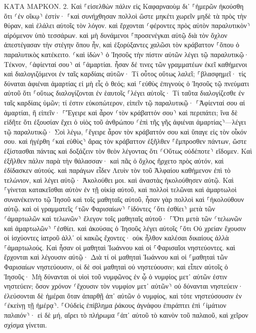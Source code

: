 \documentclass[twoside, 9pt]{extreport}
\begin{document}
ΚΑΤΑ ΜΑΡΚΟΝ.
2.
Καὶ ⸀εἰσελθὼν πάλιν εἰς Καφαρναοὺμ δι᾽ ⸀ἡμερῶν ἠκούσθη ὅτι ⸂ἐν οἴκῳ⸃ ἐστίν· 
⸀καὶ συνήχθησαν πολλοὶ ὥστε μηκέτι χωρεῖν μηδὲ τὰ πρὸς τὴν θύραν, καὶ ἐλάλει αὐτοῖς τὸν λόγον. 
καὶ ἔρχονται ⸂φέροντες πρὸς αὐτὸν παραλυτικὸν⸃ αἰρόμενον ὑπὸ τεσσάρων. 
καὶ μὴ δυνάμενοι ⸀προσενέγκαι αὐτῷ διὰ τὸν ὄχλον ἀπεστέγασαν τὴν στέγην ὅπου ἦν, καὶ ἐξορύξαντες χαλῶσι τὸν κράβαττον ⸀ὅπου ὁ παραλυτικὸς κατέκειτο. 
⸂καὶ ἰδὼν⸃ ὁ Ἰησοῦς τὴν πίστιν αὐτῶν λέγει τῷ παραλυτικῷ· Τέκνον, ⸂ἀφίενταί σου⸃ αἱ ⸀ἁμαρτίαι. 
ἦσαν δέ τινες τῶν γραμματέων ἐκεῖ καθήμενοι καὶ διαλογιζόμενοι ἐν ταῖς καρδίαις αὐτῶν· 
Τί οὗτος οὕτως λαλεῖ; ⸀βλασφημεῖ· τίς δύναται ἀφιέναι ἁμαρτίας εἰ μὴ εἷς ὁ θεός; 
καὶ ⸀εὐθὺς ἐπιγνοὺς ὁ Ἰησοῦς τῷ πνεύματι αὐτοῦ ὅτι ⸀οὕτως διαλογίζονται ἐν ἑαυτοῖς ⸀λέγει αὐτοῖς· Τί ταῦτα διαλογίζεσθε ἐν ταῖς καρδίαις ὑμῶν; 
τί ἐστιν εὐκοπώτερον, εἰπεῖν τῷ παραλυτικῷ· ⸀Ἀφίενταί σου αἱ ἁμαρτίαι, ἢ εἰπεῖν· ⸀Ἔγειρε καὶ ἆρον ⸂τὸν κράβαττόν σου⸃ καὶ περιπάτει; 
ἵνα δὲ εἰδῆτε ὅτι ἐξουσίαν ἔχει ὁ υἱὸς τοῦ ἀνθρώπου ⸂ἐπὶ τῆς γῆς ἀφιέναι ἁμαρτίας⸃—λέγει τῷ παραλυτικῷ· 
Σοὶ λέγω, ⸀ἔγειρε ἆρον τὸν κράβαττόν σου καὶ ὕπαγε εἰς τὸν οἶκόν σου. 
καὶ ἠγέρθη ⸂καὶ εὐθὺς⸃ ἄρας τὸν κράβαττον ἐξῆλθεν ⸀ἔμπροσθεν πάντων, ὥστε ἐξίστασθαι πάντας καὶ δοξάζειν τὸν θεὸν λέγοντας ὅτι ⸂Οὕτως οὐδέποτε⸃ εἴδομεν. 
Καὶ ἐξῆλθεν πάλιν παρὰ τὴν θάλασσαν· καὶ πᾶς ὁ ὄχλος ἤρχετο πρὸς αὐτόν, καὶ ἐδίδασκεν αὐτούς. 
καὶ παράγων εἶδεν Λευὶν τὸν τοῦ Ἁλφαίου καθήμενον ἐπὶ τὸ τελώνιον, καὶ λέγει αὐτῷ· Ἀκολούθει μοι. καὶ ἀναστὰς ἠκολούθησεν αὐτῷ. 
Καὶ ⸀γίνεται κατακεῖσθαι αὐτὸν ἐν τῇ οἰκίᾳ αὐτοῦ, καὶ πολλοὶ τελῶναι καὶ ἁμαρτωλοὶ συνανέκειντο τῷ Ἰησοῦ καὶ τοῖς μαθηταῖς αὐτοῦ, ἦσαν γὰρ πολλοὶ καὶ ⸀ἠκολούθουν αὐτῷ. 
καὶ οἱ γραμματεῖς ⸂τῶν Φαρισαίων⸃ ⸀ἰδόντες ⸂ὅτι ἐσθίει⸃ μετὰ τῶν ⸂ἁμαρτωλῶν καὶ τελωνῶν⸃ ἔλεγον τοῖς μαθηταῖς αὐτοῦ· ⸀Ὅτι μετὰ τῶν ⸂τελωνῶν καὶ ἁμαρτωλῶν⸃ ⸀ἐσθίει. 
καὶ ἀκούσας ὁ Ἰησοῦς λέγει αὐτοῖς ⸀ὅτι Οὐ χρείαν ἔχουσιν οἱ ἰσχύοντες ἰατροῦ ἀλλ᾽ οἱ κακῶς ἔχοντες· οὐκ ἦλθον καλέσαι δικαίους ἀλλὰ ⸀ἁμαρτωλούς. 
Καὶ ἦσαν οἱ μαθηταὶ Ἰωάννου καὶ οἱ ⸀Φαρισαῖοι νηστεύοντες. καὶ ἔρχονται καὶ λέγουσιν αὐτῷ· Διὰ τί οἱ μαθηταὶ Ἰωάννου καὶ οἱ ⸀μαθηταὶ τῶν Φαρισαίων νηστεύουσιν, οἱ δὲ σοὶ μαθηταὶ οὐ νηστεύουσιν; 
καὶ εἶπεν αὐτοῖς ὁ Ἰησοῦς· Μὴ δύνανται οἱ υἱοὶ τοῦ νυμφῶνος ἐν ᾧ ὁ νυμφίος μετ᾽ αὐτῶν ἐστιν νηστεύειν; ὅσον χρόνον ⸂ἔχουσιν τὸν νυμφίον μετ᾽ αὐτῶν⸃ οὐ δύνανται νηστεύειν· 
ἐλεύσονται δὲ ἡμέραι ὅταν ἀπαρθῇ ἀπ᾽ αὐτῶν ὁ νυμφίος, καὶ τότε νηστεύσουσιν ἐν ⸂ἐκείνῃ τῇ ἡμέρᾳ⸃. 
⸀Οὐδεὶς ἐπίβλημα ῥάκους ἀγνάφου ἐπιράπτει ἐπὶ ⸂ἱμάτιον παλαιόν⸃· εἰ δὲ μή, αἴρει τὸ πλήρωμα ⸀ἀπ᾽ αὐτοῦ τὸ καινὸν τοῦ παλαιοῦ, καὶ χεῖρον σχίσμα γίνεται. 
\end{document}
